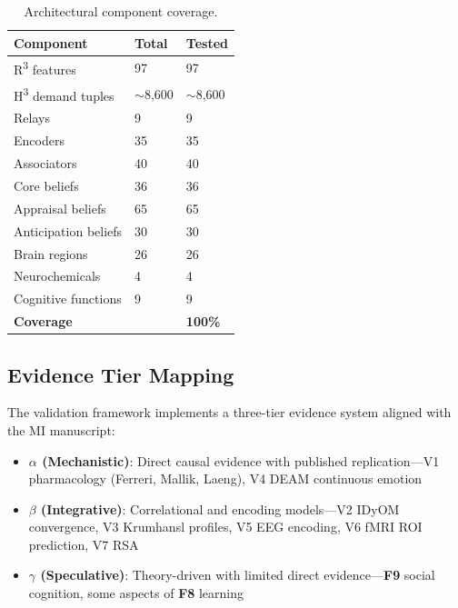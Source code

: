 \documentclass[10pt,twocolumn]{article}
\newcommand{\Rthree}{R\textsuperscript{3}}
\newcommand{\Hthree}{H\textsuperscript{3}}
\newcommand{\fn}[1]{\textbf{F#1}}
\begin{document}
\begin{table}[H]
\centering
\caption{Architectural component coverage.}\label{tab:component}
\small
\begin{tabular}{@{}L{3cm} R{1.2cm} R{1.2cm}@{}}
\toprule
\textbf{Component} & \textbf{Total} & \textbf{Tested} \\
\midrule
{}
\Rthree{} features & 97 & 97 \\
\Hthree{} demand tuples & $\sim$8,600 & $\sim$8,600 \\
Relays & 9 & 9 \\
Encoders & 35 & 35 \\
Associators & 40 & 40 \\
Core beliefs & 36 & 36 \\
Appraisal beliefs & 65 & 65 \\
Anticipation beliefs & 30 & 30 \\
Brain regions & 26 & 26 \\
Neurochemicals & 4 & 4 \\
Cognitive functions & 9 & 9 \\
\midrule
\textbf{Coverage} & & \textbf{100\%} \\
\bottomrule
\end{tabular}
\end{table}

\subsection{Evidence Tier Mapping}

The validation framework implements a three-tier evidence system aligned with the MI manuscript:

\begin{itemize}[nosep,leftmargin=*]
  \item \textbf{$\alpha$ (Mechanistic)}: Direct causal evidence with published replication---V1 pharmacology (Ferreri, Mallik, Laeng), V4 DEAM continuous emotion
  \item \textbf{$\beta$ (Integrative)}: Correlational and encoding models---V2 IDyOM convergence, V3 Krumhansl profiles, V5 EEG encoding, V6 fMRI ROI prediction, V7 RSA
  \item \textbf{$\gamma$ (Speculative)}: Theory-driven with limited direct evidence---\fn{9} social cognition, some aspects of \fn{8} learning
\end{itemize}
\end{document}
